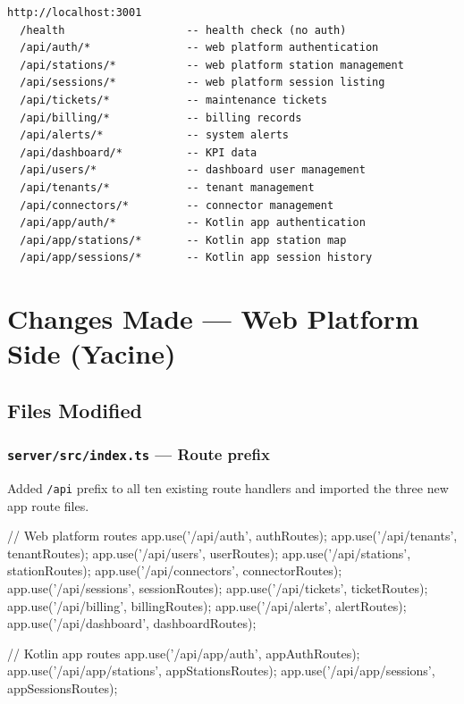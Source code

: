 \documentclass[12pt,a4paper]{report}
\newcommand{\file}[1]{\texttt{\small #1}}
\begin{document}
\begin{center}
\begin{tcolorbox}[colback=codebg, colframe=midblue, arc=4pt, width=0.9\linewidth]
\begin{lstlisting}
http://localhost:3001
  /health                   -- health check (no auth)
  /api/auth/*               -- web platform authentication
  /api/stations/*           -- web platform station management
  /api/sessions/*           -- web platform session listing
  /api/tickets/*            -- maintenance tickets
  /api/billing/*            -- billing records
  /api/alerts/*             -- system alerts
  /api/dashboard/*          -- KPI data
  /api/users/*              -- dashboard user management
  /api/tenants/*            -- tenant management
  /api/connectors/*         -- connector management
  /api/app/auth/*           -- Kotlin app authentication
  /api/app/stations/*       -- Kotlin app station map
  /api/app/sessions/*       -- Kotlin app session history
\end{lstlisting}
\end{tcolorbox}
\end{center}

\chapter{Changes Made — Web Platform Side (Yacine)}

\section{Files Modified}

\subsection{\file{server/src/index.ts} — Route prefix}

Added \texttt{/api} prefix to all ten existing route handlers and imported the three
new app route files.

\begin{greenbox}
// Web platform routes
app.use('/api/auth',       authRoutes);
app.use('/api/tenants',    tenantRoutes);
app.use('/api/users',      userRoutes);
app.use('/api/stations',   stationRoutes);
app.use('/api/connectors', connectorRoutes);
app.use('/api/sessions',   sessionRoutes);
app.use('/api/tickets',    ticketRoutes);
app.use('/api/billing',    billingRoutes);
app.use('/api/alerts',     alertRoutes);
app.use('/api/dashboard',  dashboardRoutes);

// Kotlin app routes
app.use('/api/app/auth',     appAuthRoutes);
app.use('/api/app/stations', appStationsRoutes);
app.use('/api/app/sessions', appSessionsRoutes);
\end{greenbox}
\end{document}
